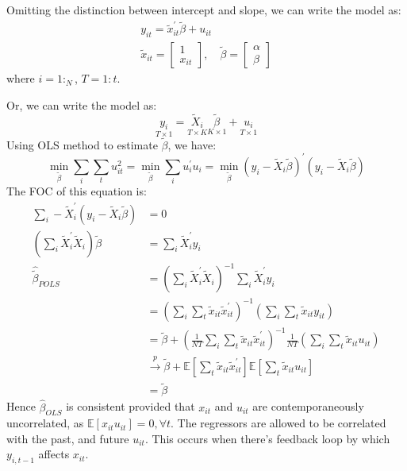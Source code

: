 Omitting the distinction between intercept and slope, we can write the model as:
\begin{gather*}
  y_{it} = \tilde{x}_{it}^{\prime} \tilde{\beta} + u_{it} \\
  \tilde{x}_{it} = \begin{bmatrix}
    1 \\
    x_{it}
  \end{bmatrix}, \quad
  \tilde{\beta} = \begin{bmatrix}
    \alpha \\
    \beta
  \end{bmatrix}
\end{gather*}
where $i=1:_{N} $, $T=1:t$.

Or, we can write the model as: 
\[ 
\underset{T\times 1}{y_i} = \underset{T \times K}{\tilde{X}_i} \underset{K \times 1}{\tilde{\beta}} + \underset{T \times 1}{u_i}
\]
Using OLS method to estimate $\tilde{\beta}$, we have:
\[
\underset{\tilde{\beta}}{\min} \sum_i \sum_t u_{it}^2 = \underset{\tilde{\beta}}{\min} \sum_i u_i^{\prime} u_i = \underset{\tilde{\beta}}{\min} (y_i - \tilde{X}_i \tilde{\beta})^{\prime} (y_i - \tilde{X}_i \tilde{\beta})
\]
The FOC of this equation is:
\begin{align*}
  \sum_i -\tilde{X}_i^{\prime} (y_i - \tilde{X}_i \tilde{\beta}) &= 0 \\
  \left(\sum_i \tilde{X}_i^{\prime} \tilde{X}_i \right) \tilde{\beta} &= \sum_i \tilde{X}_i^{\prime} y_i \\
  \hat{\tilde{\beta}}_{POLS} &= \left(\sum_i \tilde{X}_i^{\prime} \tilde{X}_i \right)^{-1} \sum_i \tilde{X}_i^{\prime} y_i \\
  &= \left(\sum_i \sum_t \tilde{x}_{it} \tilde{x}_{it}^{\prime} \right)^{-1} \left( \sum_i \sum_t \tilde{x}_{it} y_{it} \right) \\
  &= \tilde{\beta} + \left(\frac{1}{NT} \sum_i \sum_t \tilde{x}_{it} \tilde{x}_{it}^{\prime} \right)^{-1} \frac{1}{NT} \left( \sum_i \sum_t \tilde{x}_{it} u_{it} \right) \\
  & \overset{p}{\rightarrow} \tilde{\beta} + \mathbb{E}\left[\sum_t \tilde{x}_{it} \tilde{x}_{it}^{\prime} \right] \mathbb{E}\left[\sum_t \tilde{x}_{it} u_{it} \right] \\
  &= \tilde{\beta}
\end{align*}
Hence $\hat{\beta}_{OLS}$ is consistent provided that $x_{it}$ and $u_{it}$ are contemporaneously uncorrelated,
as $\mathbb{E}[x_{it} u_{it}] = 0, \forall t.$
The regressors are allowed to be correlated with the past, and future $u_{it}$.
This occurs when there's feedback loop by which $y_{i,t-1}$ affects $x_{it}$.

